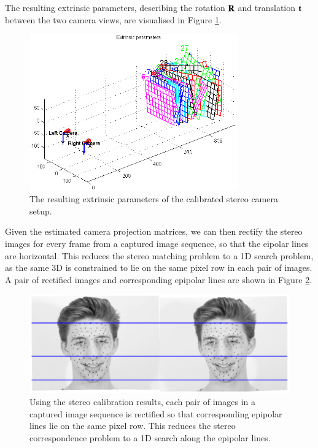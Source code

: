 The resulting extrinsic parameters, describing the rotation $\mathbf{R}$ and translation $\mathbf{t}$ between the two camera views, are visualised in Figure \ref{fig:calib}.

\begin{figure}[htbp!]
\centering
\includegraphics[width=0.8\textwidth]{img/calib}
	\caption{The resulting extrinsic parameters of the calibrated stereo camera setup.}
	\label{fig:calib}
\end{figure}

Given the estimated camera projection matrices, we can then rectify the stereo images for every frame from a captured image sequence, so that the eipolar lines are horizontal. This reduces the stereo matching problem to a 1D search problem, as the same 3D is constrained to lie on the same pixel row in each pair of images. A pair of rectified images and corresponding epipolar lines are shown in Figure \ref{fig:epipolarlines}.

\begin{figure}[htbp!]
\centering
\includegraphics[width=\textwidth]{img/epipolarlines}
	\caption{Using the stereo calibration results, each pair of images in a captured image sequence is rectified so that corresponding epipolar lines lie on the same pixel row. This reduces the stereo correspondence problem to a 1D search along the epipolar lines.}
	\label{fig:epipolarlines}
\end{figure}

